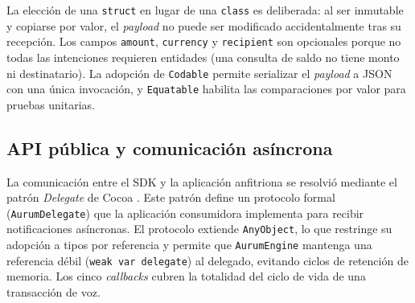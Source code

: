 \begin{table}[H]
\caption{Campos de la estructura \texttt{Transaction\allowbreak{}Payload}.}
\centering
{}
\label{tab:payload}
\end{table}

La elección de una \texttt{struct} en lugar de una \texttt{class} es deliberada: al ser inmutable y copiarse por valor, el \textit{payload} no puede ser modificado accidentalmente tras su recepción. Los campos \texttt{amount}, \texttt{currency} y \texttt{recipient} son opcionales porque no todas las intenciones requieren entidades (una consulta de saldo no tiene monto ni destinatario). La adopción de \texttt{Codable} permite serializar el \textit{payload} a JSON con una única invocación, y \texttt{Equatable} habilita las comparaciones por valor para pruebas unitarias.

\subsection{API pública y comunicación asíncrona}

La comunicación entre el SDK y la aplicación anfitriona se resolvió mediante el patrón \textit{Delegate} de Cocoa \citep{apple-delegation}. Este patrón define un protocolo formal (\texttt{Aurum\allowbreak{}Delegate}) que la aplicación consumidora implementa para recibir notificaciones asíncronas. El protocolo extiende \texttt{AnyObject}, lo que restringe su adopción a tipos por referencia y permite que \texttt{Aurum\allowbreak{}Engine} mantenga una referencia débil (\texttt{weak var delegate}) al delegado, evitando ciclos de retención de memoria. Los cinco \textit{callbacks} cubren la totalidad del ciclo de vida de una transacción de voz.

